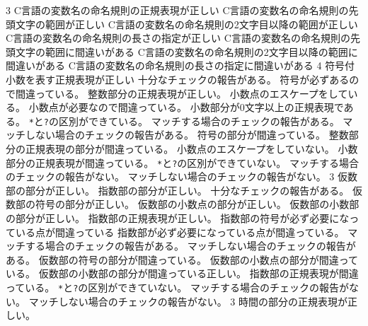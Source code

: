 \ProblemNN{


\Newpage


}
{
{}{3}
	{
	{C言語の変数名の命名規則の正規表現が正しい}
	}
	{
	{C言語の変数名の命名規則の先頭文字の範囲が正しい}
	{C言語の変数名の命名規則の2文字目以降の範囲が正しい}
	{C言語の変数名の命名規則の長さの指定が正しい}
	}
	{
	{C言語の変数名の命名規則の先頭文字の範囲に間違いがある}
	{C言語の変数名の命名規則の2文字目以降の範囲に間違いがある}
	{C言語の変数名の命名規則の長さの指定に間違いがある}
	}
	{}{4}
	{
	{符号付小数を表す正規表現が正しい}
	{十分なチェックの報告がある。}
	}
	{
	{符号が必ずあるので間違っている。}
	{整数部分の正規表現が正しい。}
	{小数点のエスケープをしている。}
	{小数点が必要なので間違っている。}
	{小数部分が0文字以上の正規表現である。}
	{\texttt{*}と\texttt{?}の区別ができている。}
	{マッチする場合のチェックの報告がある。}
	{マッチしない場合のチェックの報告がある。}
	}
	{
	{符号の部分が間違っている。}
	{整数部分の正規表現の部分が間違っている。}
	{小数点のエスケープをしていない。}
	{小数部分の正規表現が間違っている。}
	{\texttt{*}と\texttt{?}の区別ができていない。}
	{マッチする場合のチェックの報告がない。}
	{マッチしない場合のチェックの報告がない。}
	}
	{}{3}
	{
	{仮数部の部分が正しい。}
	{指数部の部分が正しい。}
	{十分なチェックの報告がある。}
	}
	{
	{仮数部の符号の部分が正しい。}
	{仮数部の小数点の部分が正しい。}
	{仮数部の小数部の部分が正しい。}
	{指数部の正規表現が正しい。}
	{指数部の符号が必ず必要になっている点が間違っている}
	{指数部が必ず必要になっている点が間違っている。}
	{マッチする場合のチェックの報告がある。}
	{マッチしない場合のチェックの報告がある。}
	}
	{
	{仮数部の符号の部分が間違っている。}
	{仮数部の小数点の部分が間違っている。}
	{仮数部の小数部の部分が間違っている正しい。}
	{指数部の正規表現が間違っている。}
	{\texttt{*}と\texttt{?}の区別ができていない。}
	{マッチする場合のチェックの報告がない。}
	{マッチしない場合のチェックの報告がない。}
	}
	{}{3}
	{
	{時間の部分の正規表現が正しい。}
}}
